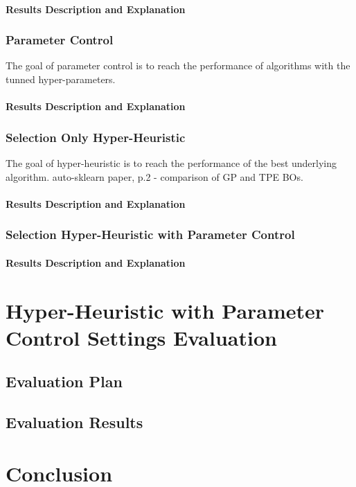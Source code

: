 \paragraph{Results Description and Explanation}


\subsubsection{Parameter Control}
The goal of parameter control is to reach the performance of algorithms with the tunned hyper-parameters.
\paragraph{Results Description and Explanation}


\subsubsection{Selection Only Hyper-Heuristic}
The goal of hyper-heuristic is to reach the performance of the best underlying algorithm.
auto-sklearn paper, p.2 - comparison of GP and TPE BOs.

\paragraph{Results Description and Explanation}


\subsubsection{Selection Hyper-Heuristic with Parameter Control}

\paragraph{Results Description and Explanation}





\section{Hyper-Heuristic with Parameter Control Settings Evaluation}\label{eval: hh-pc}
\subsection{Evaluation Plan}\label{eval: hh-pc plan}
\subsection{Evaluation Results}\label{eval: hh-pc results}



\section{Conclusion}\label{eval: conclution}
